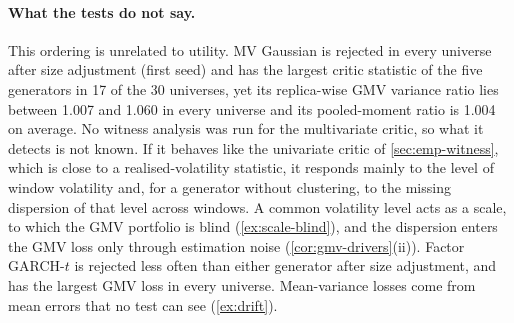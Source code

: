 \paragraph{What the tests do not say.}
This ordering is unrelated to utility. MV Gaussian is rejected in every universe after size
adjustment (first seed) and has the largest critic statistic of the five generators in 17 of the
30 universes, yet its replica-wise GMV variance ratio lies between 1.007 and 1.060 in every
universe and its pooled-moment ratio is 1.004 on average. No witness analysis was run for the
multivariate critic, so what it detects is not known. If it behaves like the univariate critic of
\cref{sec:emp-witness}, which is close to a realised-volatility statistic, it responds mainly to
the level of window volatility and, for a generator without clustering, to the missing dispersion
of that level across windows. A common volatility level acts as a scale, to which the GMV
portfolio is blind (\cref{ex:scale-blind}), and the dispersion enters the GMV loss only through
estimation noise (\cref{cor:gmv-drivers}(ii)). Factor GARCH-$t$ is rejected less often than
either \iid{} generator after size adjustment, and has the largest GMV loss in every universe.
Mean-variance losses come from mean errors that no test can see (\cref{ex:drift}).

\begin{table}[tbp]
  \centering
  \caption{Reproducibility of the E4 test quantities across synthetic seeds: Spearman
  correlation between the values of the first and the second synthetic seed. Within generator:
  across the 30 universes of one generator (the variation used by the within-generator view of
  \cref{tab:e4-link}), and the mean of the five values. Pooled: over the 150 (universe,
  generator) points. Reference: last 615 days of real \TRAIN{}, the same data in both seeds, so
  that only the randomness of the test differs (split, initialisation and mini-batches of the
  critic; wild-bootstrap multipliers of MMD). \WC{}: time-block split, critic trained on 60 to 63
  windows of dimension 150 per sample; MMD: bandwidth fixed per universe.}
  \label{tab:manual-e4-reliability}
  \small
\end{table}

